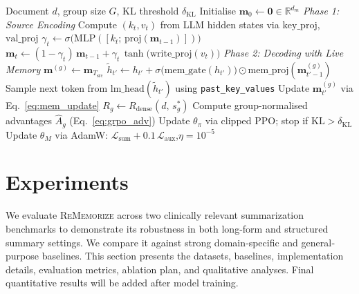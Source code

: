 \documentclass{article}
\begin{document}
\begin{algorithm}[t]
\caption{\textsc{ReMemorize}: GRPO-Guided GRU Memory Optimisation}
\label{alg:rememorize}
\begin{algorithmic}[1]
\REQUIRE Document $d$, group size $G$, KL threshold $\delta_{\mathrm{KL}}$
\STATE Initialise $\mathbf{m}_0 \leftarrow \mathbf{0} \in \mathbb{R}^{d_m}$
\STATE \textit{Phase 1: Source Encoding}
  \STATE Compute $(k_t, v_t)$ from LLM hidden states via $\mathrm{key\_proj}$, $\mathrm{val\_proj}$
  \STATE $\gamma_t \leftarrow \sigma\bigl(\mathrm{MLP}([k_t;\,\mathrm{proj}(\mathbf{m}_{t-1})])\bigr)$ 
  \STATE $\mathbf{m}_t \leftarrow (1{-}\gamma_t)\,\mathbf{m}_{t-1} + \gamma_t\,\tanh\bigl(\mathrm{write\_proj}(v_t)\bigr)$ 
\ENDFOR
\STATE \textit{Phase 2: Decoding with Live Memory}
  \STATE $\mathbf{m}^{(g)} \leftarrow \mathbf{m}_{T_{\text{src}}}$
    \STATE $\tilde{h}_{t'} \leftarrow h_{t'} + \sigma\bigl(\mathrm{mem\_gate}(h_{t'})\bigr) \odot \mathrm{mem\_proj}(\mathbf{m}^{(g)}_{t'-1})$ 
    \STATE Sample next token from $\mathrm{lm\_head}(\tilde{h}_{t'})$ using \texttt{past\_key\_values}
    \STATE Update $\mathbf{m}^{(g)}_{t'}$ via Eq.~\ref{eq:mem_update}
  \ENDFOR
  \STATE $R_g \leftarrow R_{\text{dense}}(d,\, s^*_g)$ 
\ENDFOR
\STATE Compute group-normalised advantages $\hat{A}_g$ (Eq.~\ref{eq:grpo_adv})
\STATE Update $\theta_\pi$ via clipped PPO; stop if $\mathrm{KL} > \delta_{\mathrm{KL}}$
\STATE Update $\theta_M$ via AdamW: $\mathcal{L}_{\text{sum}} + 0.1\,\mathcal{L}_{\text{aux}}$,\quad $\eta{=}10^{-5}$
\end{algorithmic}
\end{algorithm}


\section{Experiments}
\label{sec:experiments}

We evaluate \textsc{ReMemorize} across two clinically relevant summarization benchmarks to demonstrate its robustness in both long-form and structured summary settings. We compare it against strong domain‐specific and general‐purpose baselines. This section presents the datasets, baselines, implementation details, evaluation metrics, ablation plan, and qualitative analyses. Final quantitative results will be added after model training.
\end{document}
